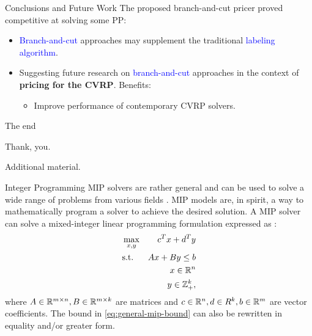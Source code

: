 \begin{frame}{Conclusions and Future Work}
	The proposed branch-and-cut pricer proved competitive at solving some PP:
	\begin{itemize}
		\item \textcolor{blue}{Branch-and-cut} approaches may supplement the traditional \textcolor{blue}{labeling algorithm}.
		\item Suggesting future research on \textcolor{blue}{branch-and-cut} approaches in the context of \textbf{pricing for the CVRP}.
		      Benefits:
		      \begin{itemize}
			      \item Improve performance of contemporary CVRP solvers.
		      \end{itemize}
	\end{itemize}
\end{frame}

\begin{frame}{The end}
	\begin{center}
		\begingroup
		\fontsize{18pt}{18pt}\selectfont
		Thank, you.
		\endgroup
	\end{center}
\end{frame}

\appendix

\begin{frame}
\end{frame}

\begin{frame}
	\begin{center}
		\begingroup
		\fontsize{18pt}{18pt}\selectfont
		Additional material.
		\endgroup
	\end{center}
\end{frame}

\begin{frame}{Integer Programming}
	MIP solvers are rather general and can be used to solve a wide range of problems from various fields \parencite{bixby2007progress}.
	MIP models are, in spirit, a way to mathematically program a solver to achieve the desired solution.
	A MIP solver can solve a mixed-integer linear programming formulation
	expressed as \parencite{wolsey1999integer}:
	\begin{align}
		 & \max_{x, y} & c^T x + d^T y                                 \\
		 & \text{s.t.} & A x + B y \le b  \label{eq:general-mip-bound} \\
		 &             & x \in \mathbb R^n                                    \\
		 &             & y \in \mathbb Z_{+}^k,
	\end{align}
	where $A \in \mathbb R^{m \times n}, B \in \mathbb R^{m \times k}$ are matrices and
	$c \in \mathbb R^n, d \in R^k, b \in \mathbb R^m$ are vector coefficients.
	The bound in \cref{eq:general-mip-bound} can also be rewritten in equality and/or greater form.

\end{frame}

